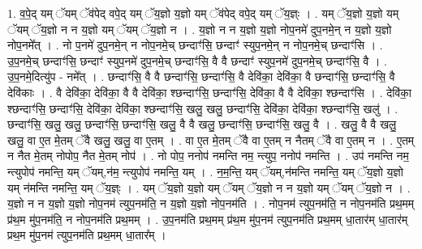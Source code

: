 \documentclass[17pt]{extarticle}
\begin{document}
1. व॒पे॒द् यम् ॅयम् ॅव॑पेद् वपे॒द् यम् ॅय॒ज्ञो य॒ज्ञो यम् ॅव॑पेद् वपे॒द् यम् ॅय॒ज्ञ्ः । . यम् ॅय॒ज्ञो य॒ज्ञो यम् ॅयम् ॅय॒ज्ञो न न य॒ज्ञो यम् ॅयम् ॅय॒ज्ञो न । . य॒ज्ञो न न य॒ज्ञो य॒ज्ञो नोप॒नमे॑ दुप॒नमे॒न् न य॒ज्ञो य॒ज्ञो नोप॒नमे᳚त् । . नो प॒नमे॑ दुप॒नमे॒न् न नोप॒नमे॒च् छन्दाꣳ॑सि॒ छन्दाꣳ॑ स्युप॒नमे॒न् न नोप॒नमे॒च् छन्दाꣳ॑सि । . उ॒प॒नमे॒च् छन्दाꣳ॑सि॒ छन्दाꣳ॑ स्युप॒नमे॑ दुप॒नमे॒च् छन्दाꣳ॑सि॒ वै वै छन्दाꣳ॑ स्युप॒नमे॑ दुप॒नमे॒च् छन्दाꣳ॑सि॒ वै । . उ॒प॒नमे॒दित्यु॑प - नमे᳚त् । . छन्दाꣳ॑सि॒ वै वै छन्दाꣳ॑सि॒ छन्दाꣳ॑सि॒ वै देवि॑का॒ देवि॑का॒ वै छन्दाꣳ॑सि॒ छन्दाꣳ॑सि॒ वै देवि॑काः । . वै देवि॑का॒ देवि॑का॒ वै वै देवि॑का॒ श्छन्दाꣳ॑सि॒ छन्दाꣳ॑सि॒ देवि॑का॒ वै वै देवि॑का॒ श्छन्दाꣳ॑सि । . देवि॑का॒ श्छन्दाꣳ॑सि॒ छन्दाꣳ॑सि॒ देवि॑का॒ देवि॑का॒ श्छन्दाꣳ॑सि॒ खलु॒ खलु॒ छन्दाꣳ॑सि॒ देवि॑का॒ देवि॑का॒ श्छन्दाꣳ॑सि॒ खलु॑ । . छन्दाꣳ॑सि॒ खलु॒ खलु॒ छन्दाꣳ॑सि॒ छन्दाꣳ॑सि॒ खलु॒ वै वै खलु॒ छन्दाꣳ॑सि॒ छन्दाꣳ॑सि॒ खलु॒ वै । . खलु॒ वै वै खलु॒ खलु॒ वा ए॒त मे॒तम् ॅवै खलु॒ खलु॒ वा ए॒तम् । . वा ए॒त मे॒तम् ॅवै वा ए॒तम् न नैतम् ॅवै वा ए॒तम् न । . ए॒तम् न नैत मे॒तम् नोपोप॒ नैत मे॒तम् नोप॑ । . नो पोप॒ ननोप॑ नमन्ति नम॒ न्त्युप॒ ननोप॑ नमन्ति । . उप॑ नमन्ति नम॒ न्त्युपोप॑ नमन्ति॒ यम् ॅयम्,न॑म॒ न्त्युपोप॑ नमन्ति॒ यम् । . न॒म॒न्ति॒ यम् ॅयम्,न॑मन्ति नमन्ति॒ यम् ॅय॒ज्ञो य॒ज्ञो यम् न॑मन्ति नमन्ति॒ यम् ॅय॒ज्ञ्ः । . यम् ॅय॒ज्ञो य॒ज्ञो यम् ॅयम् ॅय॒ज्ञो न न य॒ज्ञो यम् ॅयम् ॅय॒ज्ञो न । . य॒ज्ञो न न य॒ज्ञो य॒ज्ञो नोप॒नम॑ त्युप॒नम॑ति॒ न य॒ज्ञो य॒ज्ञो नोप॒नम॑ति । . नोप॒नम॑ त्युप॒नम॑ति॒ न नोप॒नम॑ति प्रथ॒मम् प्र॑थ॒म मु॑प॒नम॑ति॒ न नोप॒नम॑ति प्रथ॒मम् । . उ॒प॒नम॑ति प्रथ॒मम् प्र॑थ॒म मु॑प॒नम॑ त्युप॒नम॑ति प्रथ॒मम् धा॒तार॑म् धा॒तार॑म् प्रथ॒म मु॑प॒नम॑ त्युप॒नम॑ति प्रथ॒मम् धा॒तार᳚म् । \newline
\end{document}
